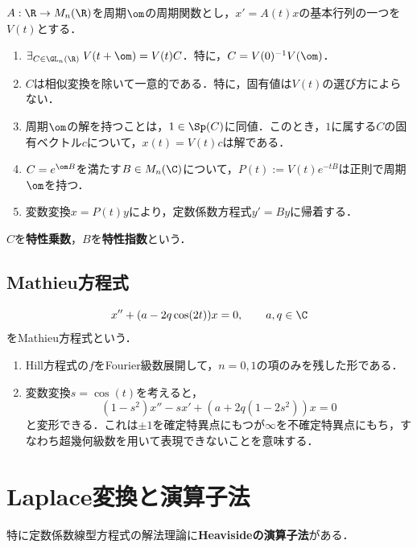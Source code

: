 \documentclass[uplatex,dvipdfmx]{jsreport}
\begin{document}
\begin{theorem}[Floquet]
    $A:\R\to M_n(\R)$を周期$\om$の周期関数とし，$x'=A(t)x$の基本行列の一つを$V(t)$とする．
    \begin{enumerate}
        \item $\exists_{C\in\GL_n(\R)}\;V(t+\om)=V(t)C$．特に，$C=V(0)^{-1}V(\om)$．
        \item $C$は相似変換を除いて一意的である．特に，固有値は$V(t)$の選び方によらない．
        \item 周期$\om$の解を持つことは，$1\in\Sp(C)$に同値．このとき，$1$に属する$C$の固有ベクトル$c$について，$x(t)=V(t)c$は解である．
        \item $C=e^{\om B}$を満たす$B\in M_n(\C)$について，$P(t):=V(t)e^{-tB}$は正則で周期$\om$を持つ．
        \item 変数変換$x=P(t)y$により，定数係数方程式$y'=By$に帰着する．
    \end{enumerate}
    $C$を\textbf{特性乗数}，$B$を\textbf{特性指数}という．
\end{theorem}

\subsection{Mathieu方程式}

\begin{problem}
    \[x''+(a-2q\cos(2t))x=0,\qquad a,q\in\C\]
    をMathieu方程式という．
    \begin{enumerate}
        \item Hill方程式の$f$をFourier級数展開して，$n=0,1$の項のみを残した形である．
        \item 変数変換$s=\cos(t)$を考えると，
        \[(1-s^2)x''-sx'+(a+2q(1-2s^2))x=0\]
        と変形できる．これは$\pm1$を確定特異点にもつが$\infty$を不確定特異点にもち，すなわち超幾何級数を用いて表現できないことを意味する．
    \end{enumerate}
\end{problem}

\section{Laplace変換と演算子法}

\begin{tcolorbox}[colframe=ForestGreen, colback=ForestGreen!10!white,breakable,colbacktitle=ForestGreen!40!white,coltitle=black,fonttitle=\bfseries\sffamily,
title=]
    特に定数係数線型方程式の解法理論に\textbf{Heavisideの演算子法}がある．
\end{tcolorbox}
\end{document}
